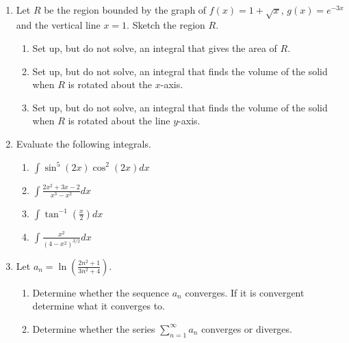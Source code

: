 \documentclass[11pt,fleqn]{article}
\begin{document}
\renewcommand{\headrulewidth}{0pt}
\newcommand{\blank}[1]{\rule{#1}{0.75pt}}
\newcommand{\bc}{\begin{center}}
\newcommand{\ec}{\end{center}}
\renewcommand{\d}{\displaystyle}

\vspace*{-0.7in}

\begin{center}
  \large
  \\
  
\end{center}

\begin{enumerate}
\item Let $R$ be the region bounded by the graph of $f(x) = 1 +
  \sqrt{x}$, $g(x) = e^{-3x}$ and the vertical line $x = 1$. Sketch the region $R$.
  \begin{enumerate}
  \item Set up, but do not solve, an integral that gives the area of
    $R$.
  \item Set up, but do not solve, an integral that finds the volume of
    the solid when $R$ is rotated about the $x$-axis. 

  \item Set up, but do not solve, an integral that finds the volume of
    the solid when $R$ is rotated about the line $y$-axis. 
  \end{enumerate}
  
\item Evaluate the following integrals. 

\begin{enumerate}
\item $\d \int \sin^5 ( 2 x ) \cos^2 (2 x ) dx$
\item $\d \int \frac{2x^2 + 3x - 2}{x^3 - x^2} dx$
\item $\d \int \tan^{-1}  \left( \frac{x}{2} \right) dx$ 
\item $\d \int \frac{x^2}{(4 - x^2)^{3/2}} dx$
\end{enumerate}

\item Let $\d a_n = \ln \left( \frac{2n^2 + 1}{3n^2 + 4} \right)$.

  \begin{enumerate}
  \item Determine whether the sequence $a_n$ converges. If it is
    convergent determine what it converges to.
  \item Determine whether the series $\d \sum_{n=1}^{\infty} a_n$ converges or
    diverges. 
  \end{enumerate}
  

\end{enumerate}
\end{document}
